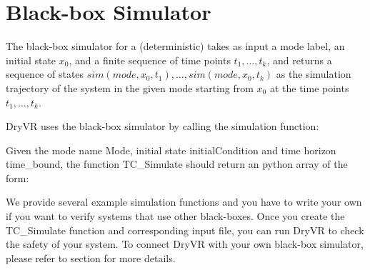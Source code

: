 \documentclass[letterpaper,10pt,english]{sphinxmanual}
\begin{document}
\section{Black-box Simulator}
\label{\detokenize{dryvr's_language:black-box-simulator}}\label{\detokenize{dryvr's_language:black-box-label}}
The black-box simulator for a (deterministic) takes as input a mode label, an initial state \(x_0\), and a finite
sequence of time points \(t_1, \ldots, t_k\), and returns a sequence of
states \(sim(mode,x_0,t_1), \ldots, sim(mode,x_0,t_k)\)
as the simulation trajectory of the system in the given mode starting from \(x_0\) at the time points \(t_1, \ldots, t_k\).

DryVR uses the black-box simulator by calling the simulation function:

\begin{sphinxVerbatim}[commandchars=\\\{\}]
\end{sphinxVerbatim}

Given the mode name \sphinxquotedblleft{}Mode\sphinxquotedblright{}, initial state \sphinxquotedblleft{}initialCondition\sphinxquotedblright{}  and time horizon \sphinxquotedblleft{}time\_bound\sphinxquotedblright{}, the function TC\_Simulate should return an python array of the form:

\begin{sphinxVerbatim}[commandchars=\\\{\}]
\PYG{p}{[}\PYG{p}{[}\PYG{p}{]}\PYG{p}{[}\PYG{p}{]}\PYG{p}{]}
\end{sphinxVerbatim}

We provide several example simulation functions and you have to write your own if you want to verify systems that use other black-boxes. Once you create the TC\_Simulate function and corresponding input file, you can run DryVR to check the safety of your system. To connect DryVR with your own black-box simulator, please refer to section {\hyperref[\detokenize{dryvr's_language:advance-label}]{}} for more details.
\end{document}
